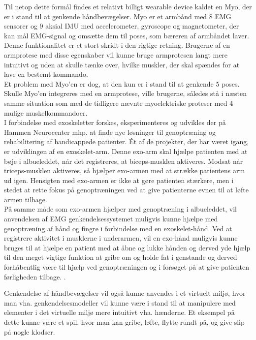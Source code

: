 Til netop dette formål findes et relativt billigt wearable device kaldet en Myo, der er i stand til at genkende håndbevægelser. Myo er et armbånd med 8 EMG sensorer og 9 aksial IMU med accelerometer, gyroscope og magnetometer, der kan mål EMG-signal og omsætte dem til poses, som bæreren af armbåndet laver. \\
Denne funktionalitet er et stort skridt i den rigtige retning. Brugerne af en armprotese med disse egenskaber vil kunne bruge armprotesen langt mere intuitivt og uden at skulle tænke over, hvilke muskler, der skal spændes for at lave en bestemt kommando.\\
Et problem med Myo'en er dog, at den kun er i stand til at genkende 5 poses. Skulle Myo'en integreres med en armprotese, ville brugerne, således stå i næsten samme situation som med de tidligere nævnte myoelektriske proteser med 4 mulige muskelkommandoer.\\

I forbindelse med exoskeletter forskes, eksperimenteres og udvikles der på Hammen Neurocenter mhp. at finde nye løsninger til genoptræning og rehabilitering af handicappede patienter. Ét af de projekter, der har været igang, er udviklingen af en exoskelet-arm\citep{RefWorks:7}. Denne exo-arm skal hjælpe patienten med at bøje i albueleddet, når det registreres, at biceps-musklen aktiveres. Modsat når triceps-musklen aktiveres, så hjælper exo-armen med at strække patientens arm ud igen. Hensigten med exo-armen er ikke at gøre patienten stærkere, men i stedet at rette fokus på genoptræningen ved at give patienterne evnen til at løfte armen tilbage.\\

På samme måde som exo-armen hjælper med genoptræning i albueleddet, vil anvendelsen af EMG genkendelsessystemet muligvis kunne hjælpe med genoptræning af hånd og fingre i forbindelse med en exoskelet-hånd. Ved at registrere aktivitet i musklerne i underarmen, vil en exo-hånd muligvis kunne bruges til at hjælpe en patient med at åbne og lukke hånden og derved yde hjælp til den meget vigtige funktion at gribe om og holde fat i genstande og derved forhåbentlig være til hjælp ved genoptræningen og i forsøget på at give patienten førligheden tilbage. .

Genkendelse af håndbevægelser vil også kunne anvendes i et virtuelt miljø, hvor man vha.  genkendelsesmodeller vil kunne være i stand til at manipulere med elementer i det virtuelle miljø mere intuitivt vha. hænderne. Et eksempel på dette kunne være et spil, hvor man kan gribe, løfte, flytte rundt på, og give slip på nogle klodser.
